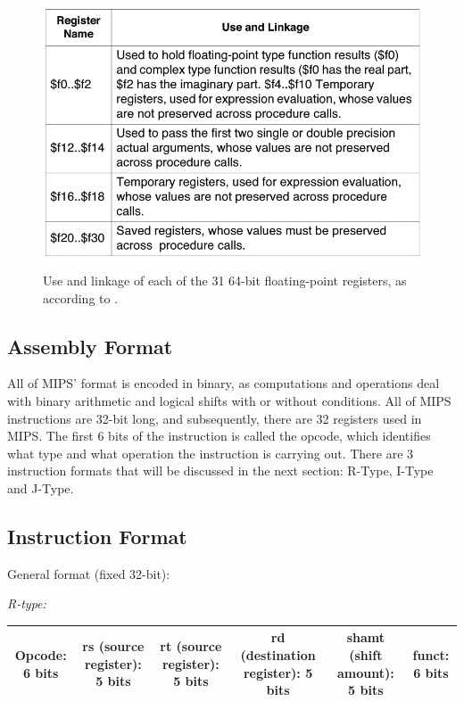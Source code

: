 \documentclass[
    paper=letter,
    parskip=half,
    fontsize=12pt,
    titlepage=firstiscover,
    toc=bibliography,
    numbers=endperiod
]{scrartcl}
\begin{document}
\begin{figure}[H]
    \includegraphics[height=8cm]{fpr-names}
    \caption{Use and linkage of each of the 31 64-bit floating-point
    registers, as according to \protect\cite[Table~1-3]{mips-programmers-guide}.}
\end{figure}

\subsection{Assembly Format}

All of MIPS' format is encoded in binary, as computations and operations
deal with binary arithmetic and logical shifts with or without
conditions. All of MIPS instructions are 32-bit long, and subsequently,
there are 32 registers used in MIPS. The first 6 bits of the instruction
is called the opcode, which identifies what type and what operation the
instruction is carrying out. There are 3 instruction formats that will
be discussed in the next section: R-Type, I-Type and J-Type.

\subsection{Instruction Format}

General format (fixed 32-bit):

\emph{R-type:}

\begin{tabularx}{\textwidth}{|C|C|C|C|C|C|}
    \hline
    Opcode: 6 bits & rs (source register): 5 bits & rt (source register): 5 bits & rd (destination register): 5 bits & shamt (shift amount): 5 bits & funct: 6 bits \\
    \hline
\end{tabularx}
\end{document}
